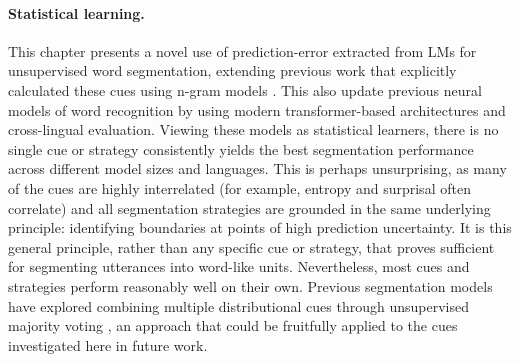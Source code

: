 
\paragraph{Statistical learning.} This chapter presents a novel use of prediction-error extracted from LMs for unsupervised word segmentation, extending previous work that explicitly calculated these cues using n-gram models \citep{ccoltekin2014explicit, Coltekin2017, goriely2023word}. This also update previous neural models of word recognition \citep{elman-1990-finding, christiansen1998learning} by using modern transformer-based architectures and cross-lingual evaluation. Viewing these models as statistical learners, there is no single cue or strategy consistently yields the best segmentation performance across different model sizes and languages. This is perhaps unsurprising, as many of the cues are highly interrelated (for example, entropy and surprisal often correlate) and all segmentation strategies are grounded in the same underlying principle: identifying boundaries at points of high prediction uncertainty. It is this general principle, rather than any specific cue or strategy, that proves sufficient for segmenting utterances into word-like units. Nevertheless, most cues and strategies perform reasonably well on their own. Previous segmentation models have explored combining multiple distributional cues through unsupervised majority voting \citep{Coltekin2017, goriely2023word}, an approach that could be fruitfully applied to the cues investigated here in future work.


